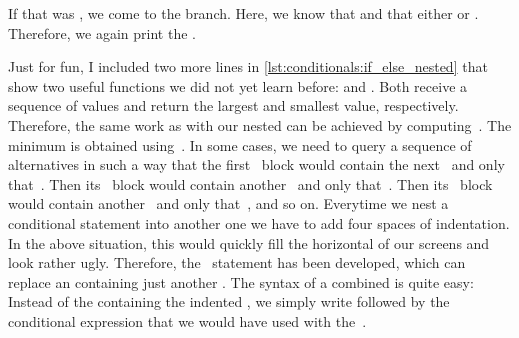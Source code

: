 If that was , we come to the  branch.
Here, we know that  and that either  or .
Therefore, we again print the  .

Just for fun, I included two more lines in \cref{lst:conditionals:if_else_nested} that show two useful functions we did not yet learn before:
 and .
Both receive a sequence of values and return the largest and smallest value, respectively.
Therefore, the same work as with our nested  can be achieved by computing~.
The minimum is obtained using~.%
\FloatBarrier%
\endhsection%
%
%
%
In some cases, we need to query a sequence of alternatives in such a way that the first ~block would contain the next~ and only that~.
Then its ~block would contain another~ and only that~.
Then its ~block would contain another~ and only that~, and so on.
Everytime we nest a conditional statement into another one we have to add four spaces of indentation.
In the above situation, this would quickly fill the horizontal of our screens and look rather ugly.
Therefore, the ~statement has been developed, which can replace an  containing just another .
The syntax of a combined  is quite easy:
Instead of the  containing the indented , we simply write  followed by the conditional expression that we would have used with the~.%
%
%
%
\FloatBarrier%
%
%
%
%
%
%
%
%
%
